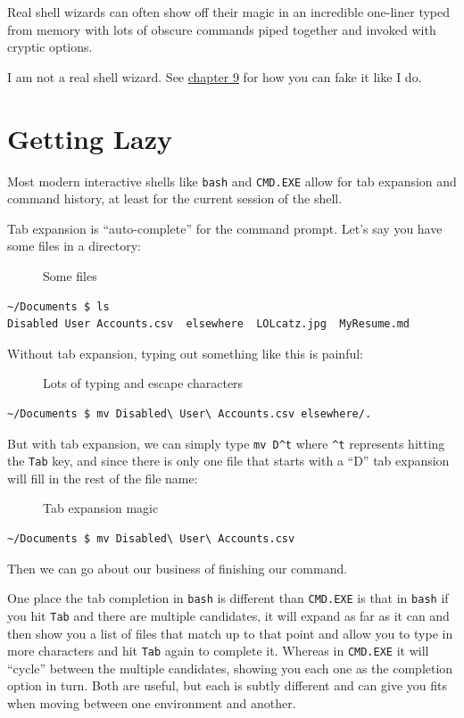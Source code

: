 \documentclass[10pt,]{book}
\numberwithin{figure}{chapter}
\DeclareRobustCommand{\drcap}[1]{\begin{figure}[H]\caption{#1}\end{figure}}
\begin{document}
Real shell wizards can often show off their magic in an incredible
one-liner typed from memory with lots of obscure commands piped together
and invoked with cryptic options.

I am not a real shell wizard. See
\hyperref[how-do-you-know-what-you-dont-know-man]{chapter 9} for how you
can fake it like I do.

\section{Getting Lazy}\label{getting-lazy}

Most modern interactive shells like \texttt{bash} and \texttt{CMD.EXE}
allow for tab expansion and command history, at least for the current
session of the shell.

Tab expansion is ``auto-complete'' for the command prompt. Let's say you
have some files in a directory:

\drcap{Some files}

\begin{verbatim}
~/Documents $ ls
Disabled User Accounts.csv  elsewhere  LOLcatz.jpg  MyResume.md
\end{verbatim}

Without tab expansion, typing out something like this is painful:

\drcap{Lots of typing and escape characters}

\begin{verbatim}
~/Documents $ mv Disabled\ User\ Accounts.csv elsewhere/.
\end{verbatim}

But with tab expansion, we can simply type \texttt{mv D\^{}t} where
\texttt{\^{}t} represents hitting the \texttt{Tab} key, and since there
is only one file that starts with a ``D'' tab expansion will fill in the
rest of the file name:

\drcap{Tab expansion magic}

\begin{verbatim}
~/Documents $ mv Disabled\ User\ Accounts.csv
\end{verbatim}

Then we can go about our business of finishing our command.

One place the tab completion in \texttt{bash} is different than
\texttt{CMD.EXE} is that in \texttt{bash} if you hit \texttt{Tab} and
there are multiple candidates, it will expand as far as it can and then
show you a list of files that match up to that point and allow you to
type in more characters and hit \texttt{Tab} again to complete it.
Whereas in \texttt{CMD.EXE} it will ``cycle'' between the multiple
candidates, showing you each one as the completion option in turn. Both
are useful, but each is subtly different and can give you fits when
moving between one environment and another.
\end{document}
